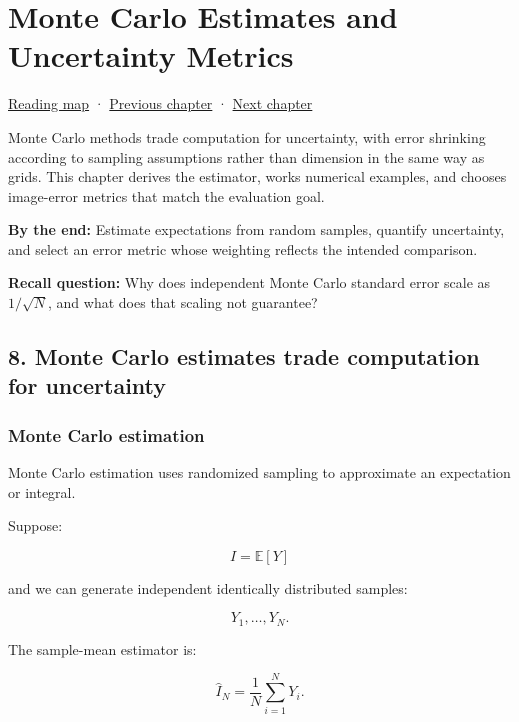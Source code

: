 \chapter{Monte Carlo Estimates and Uncertainty Metrics}\label{02-foundations-ii-ch030-monte-carlo-estimates-and-uncertainty-metrics}\hypertarget{02-foundations-ii-ch030}{}\label{stagechapter:02-foundations-ii-ch030}

\hyperref[volume-reading-map]{Reading map} · \hyperref[02-foundations-ii-ch029-discretization-convergence-and-experimental-design]{Previous chapter} · \hyperref[02-foundations-ii-ch031-implement-probability-with-numerical-contracts]{Next chapter}

Monte Carlo methods trade computation for uncertainty, with error shrinking according to sampling assumptions rather than dimension in the same way as grids. This chapter derives the estimator, works numerical examples, and chooses image-error metrics that match the evaluation goal.

\textbf{By the end:} Estimate expectations from random samples, quantify uncertainty, and select an error metric whose weighting reflects the intended comparison.

\textbf{Recall question:} Why does independent Monte Carlo standard error scale as \(1/\sqrt{N}\), and what does that scaling not guarantee?

\section{8. Monte Carlo estimates trade computation for uncertainty}\label{02-foundations-ii-ch030-monte-carlo-estimates-trade-computation-for-uncertainty}

\subsection{Monte Carlo estimation}\label{02-foundations-ii-ch030-monte-carlo-estimation}

Monte Carlo estimation uses randomized sampling to approximate an expectation or integral.

Suppose:

\[
 I=\mathbb E[Y]
\]

and we can generate independent identically distributed samples:

\[
 Y_1,\ldots,Y_N.
\]

The sample-mean estimator is:

\[
 \boxed{ \widehat I_N= \frac1N\sum_{i=1}^NY_i }.
\]

